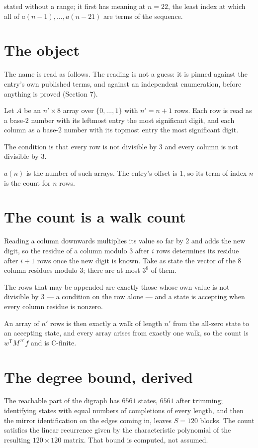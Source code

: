 \documentclass[11pt]{article}
\theoremstyle{definition}
\begin{document}
stated without a range; it first has meaning at $n = 22$, the least index at which all of $a(n-1),\dots,a(n-21)$ are terms of the sequence.

\section{The object}

The name is read as follows. The reading is not a guess: it is pinned against the entry's own published terms, and against an independent enumeration, before anything is proved (Section 7).

Let $A$ be an $n' \times 8$ array over $\{0,\dots,1\}$ with $n' = n + 1$ rows. Each row is read as a base-$2$ number with its leftmost entry the most significant digit, and each column as a base-$2$ number with its topmost entry the most significant digit.

The condition is that every row is not divisible by $3$ and every column is not divisible by $3$.

$a(n)$ is the number of such arrays. The entry's offset is 1, so its term of index $n$ is the count for $n$ rows.

\section{The count is a walk count}

Reading a column downwards multiplies its value so far by $2$ and adds the new digit, so the residue of a column modulo $3$ after $i$ rows determines its residue after $i+1$ rows once the new digit is known. Take as state the vector of the $8$ column residues modulo $3$; there are at most $3^{8}$ of them.

The rows that may be appended are exactly those whose own value is not divisible by $3$ --- a condition on the row alone --- and a state is accepting when every column residue is nonzero.

An array of $n'$ rows is then exactly a walk of length $n'$ from the all-zero state to an accepting state, and every array arises from exactly one walk, so the count is $w^{\mathsf T}M^{\,n'}f$ and is C-finite.

\section{The degree bound, derived}

The reachable part of the digraph has $6561$ states, $6561$ after trimming; identifying states with equal numbers of completions of every length, and then the mirror identification on the edges coming in, leaves $S = 120$ blocks. The count satisfies the linear recurrence given by the characteristic polynomial of the resulting $120\times120$ matrix. That bound is computed, not assumed.
\end{document}
